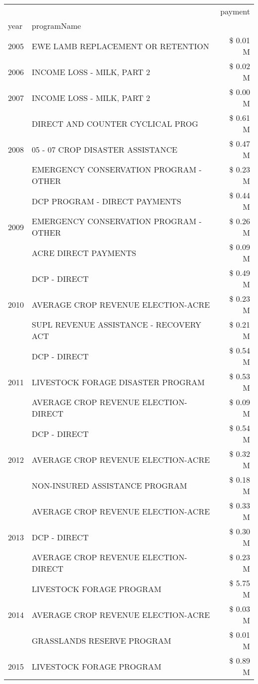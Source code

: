 \begin{tabular}{llr}
\toprule
 &  & payment \\
year & programName &  \\
\midrule
2005 & EWE LAMB REPLACEMENT OR RETENTION & \$ 0.01 M \\
\cline{1-3}
2006 & INCOME LOSS - MILK, PART 2 & \$ 0.02 M \\
\cline{1-3}
2007 & INCOME LOSS - MILK, PART 2 & \$ 0.00 M \\
\cline{1-3}
\multirow[t]{3}{*}{2008} & DIRECT AND COUNTER CYCLICAL PROG & \$ 0.61 M \\
 & 05 - 07 CROP DISASTER ASSISTANCE & \$ 0.47 M \\
 & EMERGENCY CONSERVATION PROGRAM - OTHER & \$ 0.23 M \\
\cline{1-3}
\multirow[t]{3}{*}{2009} & DCP PROGRAM - DIRECT PAYMENTS & \$ 0.44 M \\
 & EMERGENCY CONSERVATION PROGRAM - OTHER & \$ 0.26 M \\
 & ACRE DIRECT PAYMENTS & \$ 0.09 M \\
\cline{1-3}
\multirow[t]{3}{*}{2010} & DCP - DIRECT & \$ 0.49 M \\
 & AVERAGE CROP REVENUE ELECTION-ACRE & \$ 0.23 M \\
 & SUPL REVENUE ASSISTANCE - RECOVERY ACT & \$ 0.21 M \\
\cline{1-3}
\multirow[t]{3}{*}{2011} & DCP - DIRECT & \$ 0.54 M \\
 & LIVESTOCK FORAGE DISASTER PROGRAM & \$ 0.53 M \\
 & AVERAGE CROP REVENUE ELECTION-DIRECT & \$ 0.09 M \\
\cline{1-3}
\multirow[t]{3}{*}{2012} & DCP - DIRECT & \$ 0.54 M \\
 & AVERAGE CROP REVENUE ELECTION-ACRE & \$ 0.32 M \\
 & NON-INSURED ASSISTANCE PROGRAM & \$ 0.18 M \\
\cline{1-3}
\multirow[t]{3}{*}{2013} & AVERAGE CROP REVENUE ELECTION-ACRE & \$ 0.33 M \\
 & DCP - DIRECT & \$ 0.30 M \\
 & AVERAGE CROP REVENUE ELECTION-DIRECT & \$ 0.23 M \\
\cline{1-3}
\multirow[t]{3}{*}{2014} & LIVESTOCK FORAGE PROGRAM & \$ 5.75 M \\
 & AVERAGE CROP REVENUE ELECTION-ACRE & \$ 0.03 M \\
 & GRASSLANDS RESERVE PROGRAM & \$ 0.01 M \\
\cline{1-3}
\multirow[t]{3}{*}{2015} & LIVESTOCK FORAGE PROGRAM & \$ 0.89 M \\

\end{tabular}
